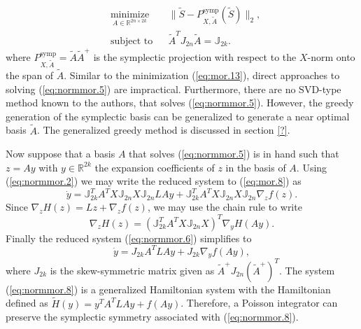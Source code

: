 \begin{equation} \label{eq:normmor.5}
\begin{aligned}
& \underset{A\in \mathbb{R}^{2n\times 2k}}{\text{minimize}}
& & \| \tilde S - P^\text{symp}_{X,\tilde A}(\tilde S) \|_2, \\
& \text{subject to}
& & \tilde A^T J_{2n} \tilde A = \mathbb J_{2k}.
\end{aligned}
\end{equation}
where $P^\text{symp}_{X,\tilde A} = \tilde A \tilde A^+$ is the symplectic projection with respect to the $X$-norm onto the span of $\tilde A$. Similar to the minimization (\ref{eq:mor.13}), direct approaches to solving (\ref{eq:normmor.5}) are impractical. Furthermore, there are no SVD-type method known to the authors, that solves (\ref{eq:normmor.5}). However, the greedy generation of the symplectic basis can be generalized to generate a near optimal basis $\tilde A$. The generalized greedy method is discussed in section \ref{?}.

Now suppose that a basis $A$ that solves (\ref{eq:normmor.5}) is in hand such that $z = Ay$ with $y\in \mathbb R^{2k}$ the expansion coefficients of $z$ in the basis of $A$. Using (\ref{eq:normmor.2}) we may write the reduced system to (\ref{eq:mor.8}) as
\begin{equation} \label{eq:normmor.6}
	\dot y = \mathbb J_{2k}^T A^T X \mathbb J_{2n} X \mathbb{J}_{2n} LAy + \mathbb J_{2k}^T A^T X \mathbb J_{2n} X \mathbb{J}_{2n} \nabla_z f(z).
\end{equation}
Since $\nabla_z H(z) = Lz + \nabla_z f(z)$, we may use the chain rule to write
\begin{equation} \label{eq:normmor.7}
	\nabla_z H(z) = ( \mathbb J_{2k}^T A^T X \mathbb J_{2n} X )^T \nabla_y H(Ay).
\end{equation}
Finally the reduced system (\ref{eq:normmor.6}) simplifies to
\begin{equation} \label{eq:normmor.8}
	\dot y = J_{2k} A^T L A y + J_{2k} \nabla_y f(Ay),
\end{equation}
where $J_{2k}$ is the skew-symmetric matrix given as $\tilde A^+ J_{2n} (\tilde A^+)^T$. The system (\ref{eq:normmor.8}) is a generalized Hamiltonian system with the Hamiltonian defined as $\tilde H(y) = y^TA^TLAy + f(Ay)$. Therefore, a Poisson integrator can preserve the symplectic symmetry associated with (\ref{eq:normmor.8}). 


